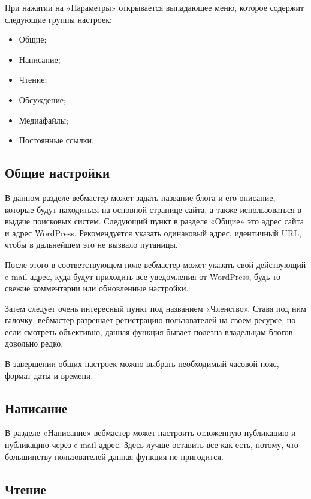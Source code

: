 При нажатии на «Параметры» открывается выпадающее меню, которое содержит следующие группы настроек:

\begin{itemize}
\item Общие;
\item Написание;
\item Чтение;
\item Обсуждение;
\item Медиафайлы;
\item Постоянные ссылки.
\end{itemize}

\subsection{Общие настройки}
\label{sec:part_wp_settings_common}

В данном разделе вебмастер может задать название блога и его описание, которые будут находиться на основной странице сайта, а также использоваться в выдаче поисковых систем.
Следующий пункт в разделе «Общие» это адрес сайта и адрес WordPress. Рекомендуется указать одинаковый адрес, идентичный URL, чтобы в дальнейшем это не вызвало путаницы.

После этого в соответствующем поле вебмастер может указать свой действующий e-mail адрес, куда будут приходить все уведомления от WordPress, будь то свежие комментарии или обновленные настройки.

Затем следует очень интересный пункт под названием «Членство». Ставя под ним галочку, вебмастер разрешает регистрацию пользователей на своем ресурсе, но если смотреть объективно, данная функция бывает полезна владельцам блогов довольно редко.

В завершении общих настроек можно выбрать необходимый часовой пояс, формат даты и времени.

\subsection{Написание}
\label{sec:part_wp_settings_write}

В разделе «Написание» вебмастер может настроить отложенную публикацию и публикацию через e-mail адрес.
Здесь лучше оставить все как есть, потому, что большинству пользователей данная функция не пригодится.

\subsection{Чтение}
\label{sec:part_wp_settings_read}

